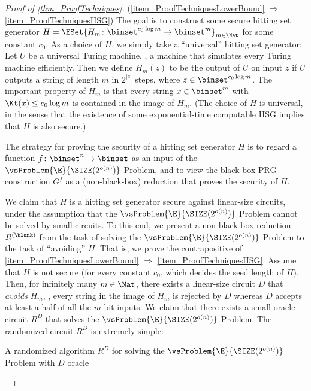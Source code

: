 \documentclass{toc}
\begin{document}
\begin{proof}
  [Proof of \cref{thm_ProofTechniques}]
  (\cref{item_ProofTechniquesLowerBound} $\Rightarrow$ \ref{item_ProofTechniquesHSG})
  The goal is to construct some secure hitting set generator
  $H = \ESet{ H_m \colon \allowbreak \binset^{c_0 \log m} \to \binset^m }_{m \in \Nat}$
  for some constant $c_0$.
  As a choice of $H$, we simply take
  a ``universal'' hitting set generator:
  Let $U$ be a universal Turing machine, \ie, a machine that simulates every Turing machine efficiently.
  Then we define $H_m(z)$ to be the output of $U$ on input $z$
  if $U$ outputs a string of length $m$ in $2^{|z|}$ steps, where $z \in \binset^{c_0 \log m}$.
  The important property of $H_m$ is that
  every string $x \in \binset^m$
  with $\Kt(x) \le c_0 \log m$ is contained in the image of $H_m$.
  (The choice of $H$ is universal, in the sense that
  the existence of some exponential-time computable HSG
  implies that $H$ is also secure.)

  The strategy for proving the security of a hitting set generator $H$
  is to regard a function $f \colon \binset^n \to \binset$ as an input of the $\vsProblem{\E}{\SIZE(2^{o(n)})}$ Problem,
  and
  to view the black-box PRG construction $G^f$
  as a (non-black-box) reduction that proves the security of $H$.

  We claim that $H$ is a hitting set generator
  secure against linear-size circuits,
  under the assumption
  that
  the $\vsProblem{\E}{\SIZE(2^{o(n)})}$ Problem cannot be solved
  by small circuits.
  To this end, we present a non-black-box reduction $R^{(\blank)}$ from
  the task of solving the $\vsProblem{\E}{\SIZE(2^{o(n)})}$ Problem
  to the task of ``avoiding'' $H$.
  That is, we prove the contrapositive of \cref{item_ProofTechniquesLowerBound} $\Rightarrow$ \ref{item_ProofTechniquesHSG}:
  Assume that $H$ is not secure (for every constant $c_0$, which decides the seed length of $H$).
  Then,
  for infinitely many $m \in \Nat$,
  there exists a linear-size circuit $D$ that \emph{avoids} $H_m$, \ie,
  every string in the image of $H_m$ is rejected by $D$ whereas $D$ accepts at least a half of all the $m$-bit inputs.
  We claim that there exists a small oracle circuit $R^D$ that solves
  the $\vsProblem{\E}{\SIZE(2^{o(n)})}$ Problem.
  The randomized circuit $R^D$ is extremely simple:
  \begin{description}
    \item[
          A randomized algorithm $R^D$ for solving the $\vsProblem{\E}{\SIZE(2^{o(n)})}$ Problem
          with $D$ oracle]
          \hspace{0em}


\end{description}
\end{proof}
\end{document}
